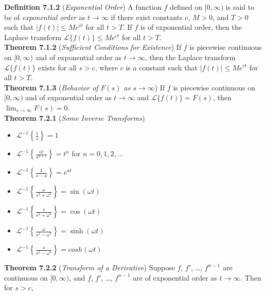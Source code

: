 \documentclass[12pt]{article}
\begin{document}
\noindent\textbf{Definition 7.1.2} (\emph{Exponential Order}) A function \(f\) defined on \([0, \infty)\) is said to be of \emph{exponential order} as \(t\to\infty\) if there exist constants \(c\), \(M > 0\), and \(T > 0\) such that \(\vert f(t) \vert \leq M e^{ct}\) for all \(t > T\). If \(f\) is of exponential order, then the Laplace transform \(\mathcal{L} \{f(t)\} \leq Me^{ct}\) for all \(t > T\).\\

\noindent\textbf{Theorem 7.1.2} (\emph{Sufficient Conditions for Existence}) If \(f\) is piecewise continuous on \([0, \infty)\) and of exponential order as \(t \to \infty\), then the Laplace transform \(\mathcal{L} \{f(t)\}\) exists for all \(s > c\), where \(c\) is a constant such that \(\vert f(t) \vert \leq Me^{ct}\) for all \(t > T\).\\

\noindent\textbf{Theorem 7.1.3} (\emph{Behavior of \(F(s)\) as \(s \to \infty\)}) If \(f\) is piecewise continuous on \([0, \infty)\) and of exponential order as \(t \to \infty\) and \(\mathcal{L} \{f(t)\} = F(s)\), then \(\lim_{s \to \infty} F(s) = 0\).\\

\noindent\textbf{Theorem 7.2.1} (\emph{Some Inverse Transforms})

\begin{itemize}
    \item [(a)] \(\mathcal{L}^{-1} \left\{ \frac{1}{s} \right\} = 1\)
    \item [(b)] \(\mathcal{L}^{-1} \left\{ \frac{n!}{s^{n+1}} \right\} = t^n\) for \(n = 0, 1, 2, \ldots\)
    \item [(c)] \(\mathcal{L}^{-1} \left\{ \frac{1}{s-a} \right\} = e^{at}\)
    \item [(d)] \(\mathcal{L}^{-1} \left\{ \frac{\omega}{s^2 + \omega^2} \right\} = \sin(\omega t)\)
    \item [(e)] \(\mathcal{L}^{-1} \left\{ \frac{s}{s^2 + \omega^2} \right\} = \cos(\omega t)\)
    \item [(f)] \(\mathcal{L}^{-1} \left\{ \frac{\omega}{s^2 - \omega^2} \right\} = \sinh(\omega t)\)
    \item [(g)] \(\mathcal{L}^{-1} \left\{ \frac{s}{s^2 - \omega^2} \right\} = cosh(\omega t)\)
\end{itemize}

\noindent\textbf{Theorem 7.2.2} (\emph{Transform of a Derivative}) Suppose \(f\), \(f'\), \ldots, \(f^{n-1}\) are continuous on \([0, \infty)\), and \(f\), \(f'\), \ldots, \(f^{n-1}\) are of exponential order as \(t \to \infty\). Then for \(s > c\),
\end{document}
